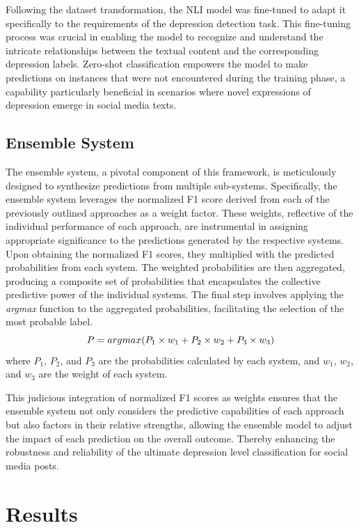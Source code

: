 \documentclass{article}
\begin{document}
Following the dataset transformation, the NLI model was fine-tuned to adapt it specifically to the requirements of the depression detection task. This fine-tuning process was crucial in enabling the model to recognize and understand the intricate relationships between the textual content and the corresponding depression labels. Zero-shot classification empowers the model to make predictions on instances that were not encountered during the training phase, a capability particularly beneficial in scenarios where novel expressions of depression emerge in social media texts.

\subsection{Ensemble System}

The ensemble system, a pivotal component of this framework, is meticulously designed to synthesize predictions from multiple sub-systems. Specifically, the ensemble system leverages the normalized F1 score derived from each of the previously outlined approaches as a weight factor. These weights, reflective of the individual performance of each approach, are instrumental in assigning appropriate significance to the predictions generated by the respective systems. Upon obtaining the normalized F1 scores, they multiplied with the predicted probabilities from each system. The weighted probabilities are then aggregated, producing a composite set of probabilities that encapsulates the collective predictive power of the individual systems. The final step involves applying the \emph{argmax} function to the aggregated probabilities, facilitating the selection of the most probable label.
\begin{equation}
    \centering
    \label{formula1}
    P = argmax(P_1 \times w_1 + P_2 \times w_2 + P_3 \times w_3)
\end{equation}
where $P_1$, $P_2$, and $P_3$ are the probabilities calculated by each system, and $w_1$, $w_2$, and $w_3$ are the weight of each system.

This judicious integration of normalized F1 scores as weights ensures that the ensemble system not only considers the predictive capabilities of each approach but also factors in their relative strengths, allowing the ensemble model to adjust the impact of each prediction on the overall outcome. Thereby enhancing the robustness and reliability of the ultimate depression level classification for social media posts.

\section{Results}
\end{document}
